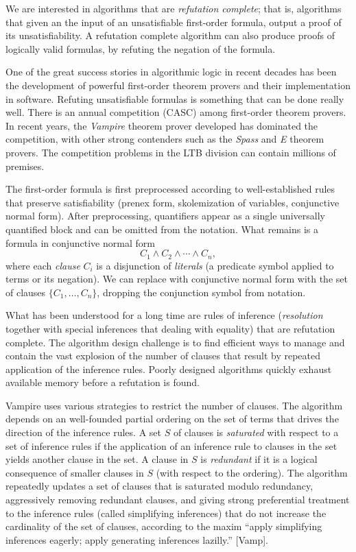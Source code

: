 \documentclass[brochure,english,12pt]{bourbaki}
\theoremstyle{plain}
\begin{document}
We are interested in algorithms that are {\it refutation complete}; that is, algorithms that given an
the input of an unsatisfiable first-order formula, output a proof of its unsatisfiability.  A refutation complete
algorithm can also produce proofs of logically valid formulas, by refuting the negation of the formula.

One of the great success stories in algorithmic logic in recent decades has been the development of
powerful first-order theorem provers and their implementation in software.   Refuting unsatisfiable formulas
 is something that can be done really well.  
There is an annual competition (CASC) among first-order theorem provers.  In recent years, the {\it Vampire} 
theorem prover developed has
dominated the competition, with other strong contenders such as the {\it Spass} and {\it E} theorem provers.  
The competition
problems in the LTB division can contain millions of premises.


The first-order formula is first preprocessed according to well-established rules that preserve satisfiability
(prenex form, skolemization of variables, conjunctive normal form).  After preprocessing, quantifiers appear
as a single universally quantified block and can be omitted from the notation.  What remains is a 
formula in conjunctive normal form
\[
C_1 \land C_2 \land \cdots \land C_n,
\]
where each {\it clause} $C_i$ is a disjunction of {\it literals} (a predicate symbol applied to terms or its negation).
We can replace with conjunctive normal form with the set of clauses $\{C_1,\ldots,C_n\}$, dropping the conjunction
symbol from notation.

What has been understood for a long time are rules of inference ({\it resolution}  together with
special inferences that dealing with equality) that are refutation complete.  The algorithm design challenge is to
find efficient ways to manage and contain the vast explosion of the number of clauses that result by repeated
application of the inference rules.  Poorly designed algorithms quickly exhaust available memory before
a refutation is found.

Vampire uses various strategies to restrict the number of clauses.  The algorithm
depends on an well-founded partial ordering on the set of terms  that drives the direction of the 
 inference rules.  
A set $S$ of clauses
is {\it saturated} with respect to a set of inference rules if the application of an inference rule to clauses in the set
yields another clause in the set.  A clause in $S$ is {\it redundant} if it is a logical consequence of smaller clauses
in $S$ (with respect to the ordering).  
The algorithm repeatedly updates a set of clauses that is saturated
modulo redundancy, aggressively removing redundant clauses, and giving strong preferential
treatment to the inference rules (called simplifying inferences) that do not increase the cardinality of the set of clauses,
according to the maxim
 ``apply simplifying inferences eagerly; apply generating inferences lazilly.'' [Vamp].
\end{document}
